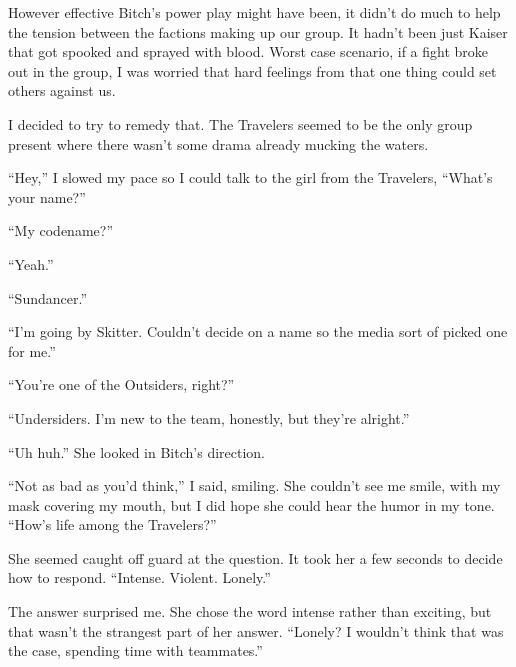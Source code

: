 





However effective Bitch's power play might have been, it didn't do much to help the tension between the factions making up our group.  It hadn't been just Kaiser that got spooked and sprayed with blood.  Worst case scenario, if a fight broke out in the group, I was worried that hard feelings from that one thing could set others against us.



I decided to try to remedy that.  The Travelers seemed to be the only group present where there wasn't some drama already mucking the waters.



``Hey,'' I slowed my pace so I could talk to the girl from the Travelers, ``What's your name?''



``My codename?''



``Yeah.''



``Sundancer.''



``I'm going by Skitter.  Couldn't decide on a name so the media sort of picked one for me.''



``You're one of the Outsiders, right?''



``Undersiders.  I'm new to the team, honestly, but they're alright.''



``Uh huh.''  She looked in Bitch's direction.



``Not as bad as you'd think,'' I said, smiling.  She couldn't see me smile, with my mask covering my mouth, but I did hope she could hear the humor in my tone.  ``How's life among the Travelers?''



She seemed caught off guard at the question.  It took her a few seconds to decide how to respond.  ``Intense.  Violent.  Lonely.''



The answer surprised me.  She chose the word intense rather than exciting, but that wasn't the strangest part of her answer.  ``Lonely?  I wouldn't think that was the case, spending time with teammates.''



